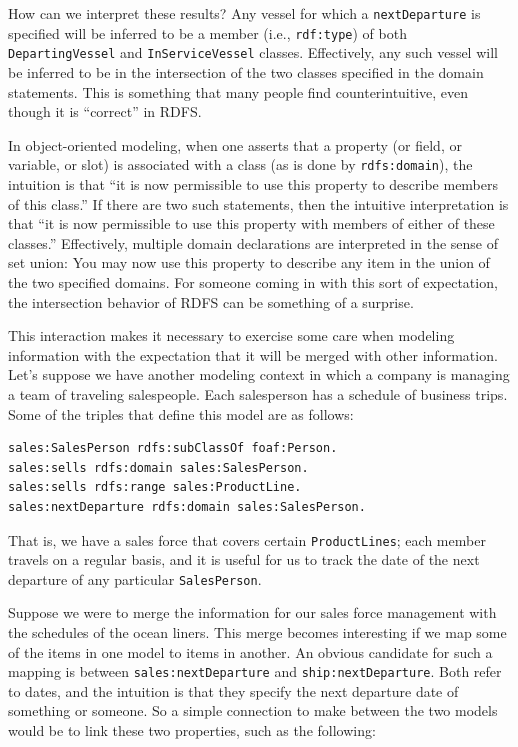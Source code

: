 How can we interpret these results? Any vessel for which a \texttt{nextDeparture}
is specified will be
inferred to be a member (i.e., \texttt{rdf:type}) of both \texttt{DepartingVessel} and
\texttt{InServiceVessel} classes. Effectively, any such vessel will be inferred
to be in the intersection of the two classes specified in the domain
statements. This is something that many people find counterintuitive,
even though it is ``correct'' in RDFS.

In object-oriented modeling, when one asserts that a property (or field,
or variable, or slot) is associated with a class (as is done by
\texttt{rdfs:domain}), the intuition is that ``it is now permissible to use this
property to describe members of this class.'' If there are two such
statements, then the intuitive interpretation is that ``it is now
permissible to use this property with members of either of these
classes.'' Effectively, multiple domain declarations are interpreted in
the sense of set union: You may now use this property to describe any
item in the union of the two specified domains. For someone coming in
with this sort of expectation, the intersection behavior of RDFS can be
something of a surprise.

This interaction makes it necessary to exercise some care when modeling
information with the expectation that it will be merged with other
information. Let's suppose we have another modeling context in which a
company is managing a team of traveling salespeople. Each salesperson
has a schedule of business trips. Some of the triples that define this
model are as follows:

\begin{lstlisting}
sales:SalesPerson rdfs:subClassOf foaf:Person.
sales:sells rdfs:domain sales:SalesPerson.
sales:sells rdfs:range sales:ProductLine.
sales:nextDeparture rdfs:domain sales:SalesPerson.
\end{lstlisting}

That is, we have a sales force that covers certain \texttt{ProductLines}; each
member travels on a regular basis, and it is useful for us to track the
date of the next departure of any particular \texttt{SalesPerson}.

Suppose we were to merge the information for our sales force management
with the schedules of
the ocean liners. This merge becomes interesting if we map some of the
items in one model to items
in another. An obvious candidate for such a mapping is between
\texttt{sales:nextDeparture} and \texttt{ship:nextDeparture}. Both refer to dates, and the
intuition is that they specify the next departure date of something or
someone. So a simple connection to make between the two models would be
to link these two properties, such as the following:

